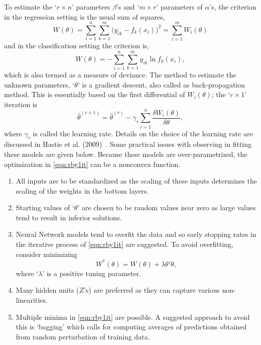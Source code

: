 To estimate the `$r \times n$' parameters $\beta$'s and `$m \times r$' parameters of $\alpha$'s, the criterion in the regression setting is the usual sum of squares,
	\begin{equation} \label{eqn:bigwtheta}
	W(\theta)= \sum_{l=1}^n \sum_{k=1}^m \big(y_{ik} - f_k(x_i)\big)^2 = \sum_{i=1}^m W_i(\theta)
	\end{equation}
and in the classification setting the criterion is, 
	\begin{equation} \label{eqn:bigwtheta2}
	W(\theta)= - \sum_{i=1}^n \sum_{k=1}^m y_{ik} \ln f_k(x_i),
	\end{equation}
which is also termed as a measure of deviance. The method to estimate the unknown parameters, `$\theta$' is a gradient descent, also called as back-propagation method. This is essentially based on the first differential of $W_i(\theta)$; the `$r \times 1$' iteration is
	\begin{equation} \label{eqn:rby1it}
	\hat{\theta}^{(r+1)}= \hat{\theta}^{(r)} - \gamma_r \sum_{i=1}^n \dfrac{\delta W_i(\theta)}{\delta \theta},
	\end{equation}
where $\gamma_r$ is called the learning rate. Details on the choice of the learning rate are discussed in Hastie et al. (2009)~\cite{hastibf}. Some practical issues with observing in fitting these models are given below. Because these models are over-parametrized, the optimization in \eqref{eqn:rby1it} can be a nonconvex function.


\begin{enumerate}[--]
\item All inputs are to be standardized as the scaling of these inputs determines the scaling of the weights in the bottom layers.
\item Starting values of `$\theta$' are chosen to be random values near zero as large values tend to result in inferior solutions.
\item Neural Network models tend to overfit the data and so early stopping rates in the iterative process of \eqref{eqn:rby1it} are suggested. To avoid overfitting, consider minimizing 
	\begin{equation}\label{eqn:overfit}
	W^*(\theta)= W(\theta) + \lambda \theta' \theta,
	\end{equation}
where `$\lambda$' is a positive tuning parameter.
\item Many hidden units ($Z$'s) are preferred as they can capture various non-linearities. 
\item Multiple minima in \eqref{eqn:rby1it} are possible. A suggested approach to avoid this is `bagging' which calls for computing averages of predictions obtained from random perturbation of training data. \\
\end{enumerate}


